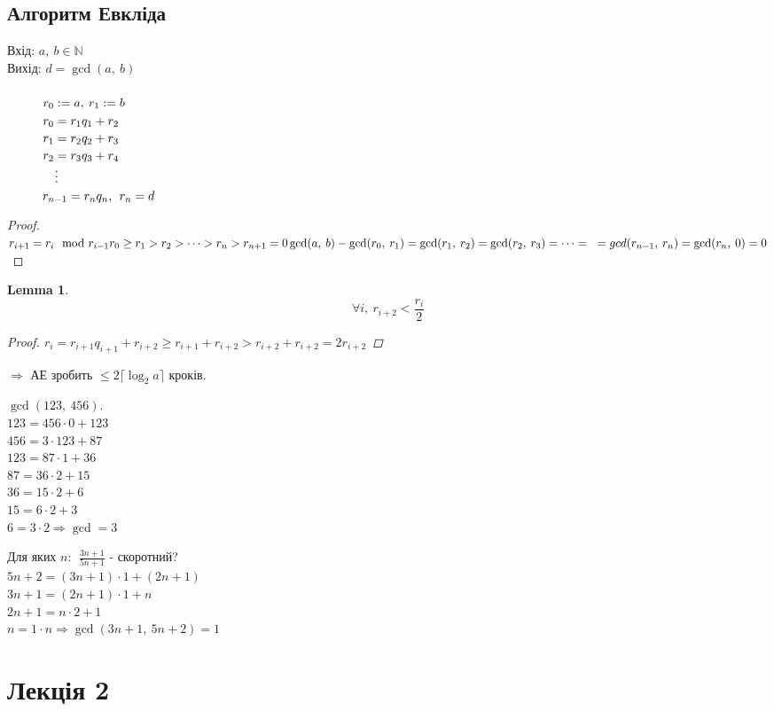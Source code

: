 \documentclass[a4paper,12pt, centered]{bookest}
\newtheorem{lemma}[theorem]{Lemma}
\newcommand\tab[1][1cm]{\hspace*{#1}}
\begin{document}
\section{Алгоритм Евкліда}
Вхід: $a,\>b\in\mathbb{N}$\\
Вихід: $d=\gcd(a,\>b)$\\\\
$\tab r_0:=a,\>r_1:=b$\\
$\tab r_0=r_1q_1+r_2$\\
$\tab r_1=r_2q_2+r_3$\\
$\tab r_2=r_3q_3+r_4$\\
$\tab\quad\vdots$\\
$\tab r_{n-1}=r_nq_n,\>\>r_n=d$
\begin{proof}
	$r_{i+1}=r_{i}\mod r_{i-1}\\ r_0\geq r_1>r_2>\dots>r_{n}>r_{n+1}=0\\\gcd(a,\>b)-\gcd(r_0,\>r_1)=\gcd(r_1,\>r_2)=\gcd(r_2,\>r_3)=\dots=\\\ =gcd(r_{n-1},\>r_n)=\gcd(r_n,\>0)=0$
\end{proof}
\begin{lemma}
	$$\forall i,\>r_{i+2}<\frac{r_i}{2}$$
	\begin{proof}
		$r_i=r_{i+1}q_{i+1}+r_{i+2}\geq r_{i+1}+r_{i+2}>r_{i+2}+r_{i+2}=2r_{i+2}$
	\end{proof}
\end{lemma}
$\Rightarrow$ АЕ зробить $\leq2\lceil\log_2a\rceil$ кроків.
\begin{example}
	$\gcd(123,\>456).$\\
	$123=456\cdot 0+123$\\
	$456=3\cdot 123+87$\\
	$123=87\cdot 1+36$\\
	$87=36\cdot 2+15$\\
	$36=15\cdot 2+6$\\
	$15=6\cdot 2+3$\\
	$6=3\cdot2\Rightarrow \gcd = 3$
\end{example}
\begin{example}
	Для яких $n:\>\>\frac{3n+1}{5n+1}$ - скоротний?\\
	$5n+2=(3n+1)\cdot 1+(2n+1)$\\
	$3n+1=(2n+1)\cdot 1+n$\\
	$2n+1=n\cdot 2+1$\\
	$n=1\cdot n\Rightarrow\gcd(3n+1,\>5n+2)=1$
\end{example}
\chapter{Лекція 2}
\end{document}
